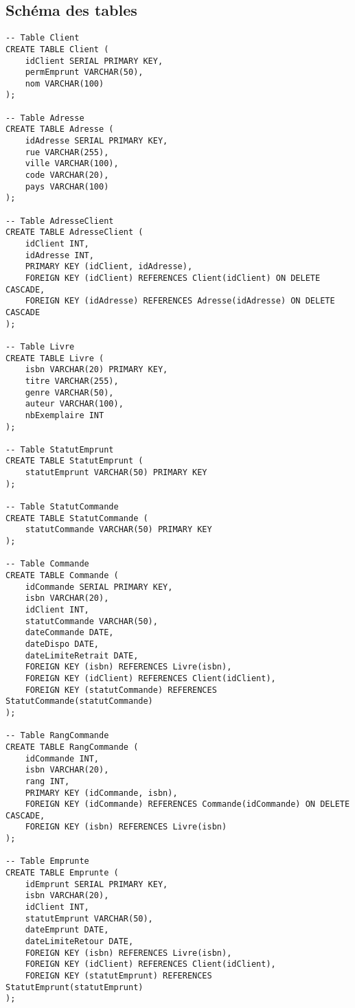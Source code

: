 \documentclass{article}
\begin{document}
\subsection{Schéma des tables}
\begin{lstlisting}
-- Table Client
CREATE TABLE Client (
    idClient SERIAL PRIMARY KEY,
    permEmprunt VARCHAR(50),
    nom VARCHAR(100)
);

-- Table Adresse
CREATE TABLE Adresse (
    idAdresse SERIAL PRIMARY KEY,
    rue VARCHAR(255),
    ville VARCHAR(100),
    code VARCHAR(20),
    pays VARCHAR(100)
);

-- Table AdresseClient
CREATE TABLE AdresseClient (
    idClient INT,
    idAdresse INT,
    PRIMARY KEY (idClient, idAdresse),
    FOREIGN KEY (idClient) REFERENCES Client(idClient) ON DELETE CASCADE,
    FOREIGN KEY (idAdresse) REFERENCES Adresse(idAdresse) ON DELETE CASCADE
);

-- Table Livre
CREATE TABLE Livre (
    isbn VARCHAR(20) PRIMARY KEY,
    titre VARCHAR(255),
    genre VARCHAR(50),
    auteur VARCHAR(100),
    nbExemplaire INT
);

-- Table StatutEmprunt
CREATE TABLE StatutEmprunt (
    statutEmprunt VARCHAR(50) PRIMARY KEY
);

-- Table StatutCommande
CREATE TABLE StatutCommande (
    statutCommande VARCHAR(50) PRIMARY KEY
);

-- Table Commande
CREATE TABLE Commande (
    idCommande SERIAL PRIMARY KEY,
    isbn VARCHAR(20),
    idClient INT,
    statutCommande VARCHAR(50),
    dateCommande DATE,
    dateDispo DATE,
    dateLimiteRetrait DATE,
    FOREIGN KEY (isbn) REFERENCES Livre(isbn),
    FOREIGN KEY (idClient) REFERENCES Client(idClient),
    FOREIGN KEY (statutCommande) REFERENCES StatutCommande(statutCommande)
);

-- Table RangCommande
CREATE TABLE RangCommande (
    idCommande INT,
    isbn VARCHAR(20),
    rang INT,
    PRIMARY KEY (idCommande, isbn),
    FOREIGN KEY (idCommande) REFERENCES Commande(idCommande) ON DELETE CASCADE,
    FOREIGN KEY (isbn) REFERENCES Livre(isbn)
);

-- Table Emprunte
CREATE TABLE Emprunte (
    idEmprunt SERIAL PRIMARY KEY,
    isbn VARCHAR(20),
    idClient INT,
    statutEmprunt VARCHAR(50),
    dateEmprunt DATE,
    dateLimiteRetour DATE,
    FOREIGN KEY (isbn) REFERENCES Livre(isbn),
    FOREIGN KEY (idClient) REFERENCES Client(idClient),
    FOREIGN KEY (statutEmprunt) REFERENCES StatutEmprunt(statutEmprunt)
);

\end{lstlisting}
\end{document}
